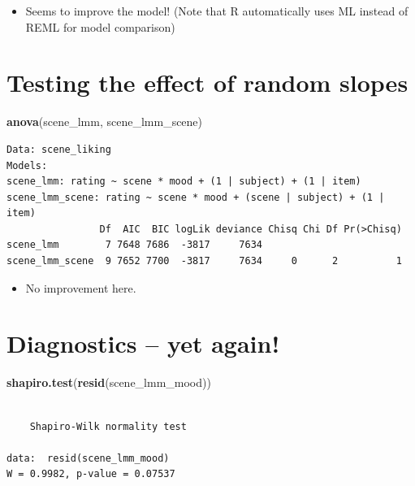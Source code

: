 \documentclass[]{article}
\newenvironment{Shaded}{}{}
\newcommand{\KeywordTok}[1]{\textcolor[rgb]{0.00,0.44,0.13}{\textbf{{#1}}}}
\newcommand{\NormalTok}[1]{{#1}}
\begin{document}
\begin{itemize}
\itemsep1pt\parskip0pt
\item
  Seems to improve the model! (Note that R automatically uses ML instead
  of REML for model comparison)
\end{itemize}

\section{Testing the effect of random
slopes}\label{testing-the-effect-of-random-slopes-1}

\begin{Shaded}
\begin{Highlighting}[]
\KeywordTok{anova}\NormalTok{(scene_lmm, scene_lmm_scene)}
\end{Highlighting}
\end{Shaded}

\begin{verbatim}
Data: scene_liking
Models:
scene_lmm: rating ~ scene * mood + (1 | subject) + (1 | item)
scene_lmm_scene: rating ~ scene * mood + (scene | subject) + (1 | item)
                Df  AIC  BIC logLik deviance Chisq Chi Df Pr(>Chisq)
scene_lmm        7 7648 7686  -3817     7634                        
scene_lmm_scene  9 7652 7700  -3817     7634     0      2          1
\end{verbatim}

\begin{itemize}
\itemsep1pt\parskip0pt
\item
  No improvement here.
\end{itemize}

\section{Diagnostics -- yet again!}\label{diagnostics-yet-again}

\begin{Shaded}
\begin{Highlighting}[]
\KeywordTok{shapiro.test}\NormalTok{(}\KeywordTok{resid}\NormalTok{(scene_lmm_mood))}
\end{Highlighting}
\end{Shaded}

\begin{verbatim}

    Shapiro-Wilk normality test

data:  resid(scene_lmm_mood)
W = 0.9982, p-value = 0.07537
\end{verbatim}
\end{document}
